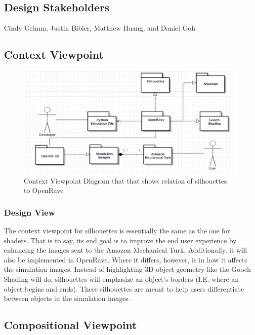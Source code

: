 \documentclass[10pt,journal,compsoc,draftclsnofoot]{IEEEtran}
\begin{document}
\begin{flushleft}
\subsection{Design Stakeholders}
Cindy Grimm, Justin Bibler, Matthew Huang, and Daniel Goh

\subsection{Context Viewpoint}

\begin{figure} [H]
  \includegraphics[scale=0.8]{Silhouettes_context.eps}
  \caption
{ \newline \hspace{\linewidth}
Context Viewpoint Diagram that that shows relation of silhouettes to OpenRave}
  \label{fig:Silhouettes_context}
\end{figure}

\subsubsection{Design View}
The context viewpoint for silhouettes is essentially the same as the one for shaders.
That is to say, its end goal is to improve the end user experience by enhancing the images sent to the Amazon Mechanical Turk.
Additionally, it will also be implemented in OpenRave.
Where it differs, however, is in how it affects the simulation images.
Instead of highlighting 3D object geometry like the Gooch Shading will do, silhouettes will emphasize an object’s borders (I.E. where an object begins and ends).
These silhouettes are meant to help users differentiate between objects in the simulation images.

\subsection{Compositional Viewpoint}


\end{flushleft}
\end{document}

